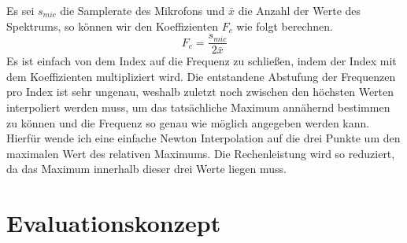 Es sei $s_{mic}$ die Samplerate des Mikrofons und $\bar{x}$ die Anzahl der Werte des Spektrums, so können wir den Koeffizienten $F_c$ wie folgt berechnen.
$$ F_c = \frac{s_{mic}}{2\bar{x}} $$
Es ist einfach von dem Index auf die Frequenz zu schließen, indem der Index mit dem Koeffizienten multipliziert wird. Die entstandene Abstufung der Frequenzen pro Index ist sehr ungenau, weshalb zuletzt noch zwischen den höchsten Werten interpoliert werden muss, um das tatsächliche Maximum annähernd bestimmen zu können und die Frequenz so genau wie möglich angegeben werden kann. Hierfür wende ich eine einfache Newton Interpolation auf die drei Punkte um den maximalen Wert des relativen Maximums. Die Rechenleistung wird so reduziert, da das Maximum innerhalb dieser drei Werte liegen muss. 

\section{Evaluationskonzept}
    
